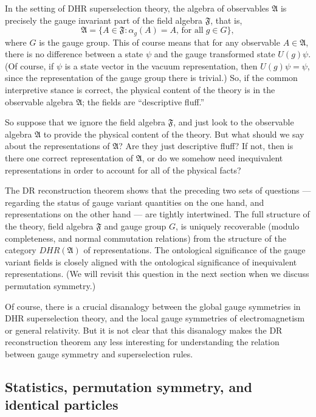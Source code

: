 \documentclass[12pt]{article}
\theoremstyle{definition}
\theoremstyle{definition}
\theoremstyle{remark}
\def\al#1{{\mathfrak #1}}
\def\a{\alpha} \def\b{\beta} \def\g{\gamma} \def\d{\delta}
\begin{document}
In the setting of DHR superselection theory, the algebra of
  observables $\al A$ is precisely the gauge invariant part of the
  field algebra $\al F$, that is,
$$ \al A = \{ A\in \al F:\a _g(A)=A, \,\mbox{for all}\; g\in G \} ,$$ where $G$ is the
gauge group.  This of course means that for any observable $A\in \al
A$, there is no difference between a state $\psi$ and the gauge
transformed state $U(g)\psi$.  (Of course, if $\psi$ is a state vector
in the vacuum representation, then $U(g)\psi =\psi$, since the
representation of the gauge group there is trivial.)  So, if the
common interpretive stance is correct, the physical content of the
theory is in the observable algebra $\al A$; the fields are
``descriptive fluff.''

So suppose that we ignore the field algebra $\al F$, and just look to
the observable algebra $\al A$ to provide the physical content of the
theory.  But what should we say about the representations of $\al A$?
Are they just descriptive fluff?  If not, then is there one correct
representation of $\al A$, or do we somehow need inequivalent
representations in order to account for all of the physical facts? 

The DR reconstruction theorem shows that the preceding two sets of
questions --- regarding the status of gauge variant quantities on the
one hand, and representations on the other hand --- are tightly
intertwined.  The full structure of the theory, field algebra $\al F$
and gauge group $G$, is uniquely recoverable (modulo completeness, and
normal commutation relations) from the structure of the category
$DHR(\al A)$ of representations.  The ontological significance of the
gauge variant fields is closely aligned with the ontological
significance of inequivalent representations.  (We will revisit this
question in the next section when we discuss permutation symmetry.)

Of course, there is a crucial disanalogy between the global gauge
symmetries in DHR superselection theory, and the local gauge
symmetries of electromagnetism or general relativity.  But it is not
clear that this disanalogy makes the DR reconstruction theorem any
less interesting for understanding the relation between gauge symmetry
and superselection rules.




\subsection{Statistics, permutation symmetry, and identical particles}
\end{document}
